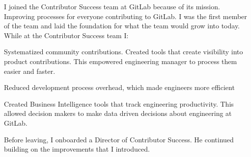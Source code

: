 \documentclass[]{matija-resume}
\begin{document}
\begin{minipage}[t]{1.0\textwidth}

\vspace{\topsep}
I joined the Contributor Success team at GitLab because of its mission. Improving processes for everyone contributing to GitLab. I was the first member of the team and laid the foundation for what the team would grow into today.\\
\vspace{\topsep}
While at the Contributor Success team I:\\
\vspace{\topsep}
\begin{tightemize}
\item Systematized community contributions. Created tools that create visibility into product contributions. This empowered engineering manager to process them easier and faster.
\item Reduced development process overhead, which made engineers more efficient
\item Created Business Intelligence tools that track engineering productivity. This allowed decision makers to make data driven decisions about engineering at GitLab.
\end{tightemize}
\vspace{\topsep}
Before leaving, I onboarded a Director of Contributor Success. He continued building on the improvements that I introduced.
\sectionsep


\end{minipage}
\end{document}
